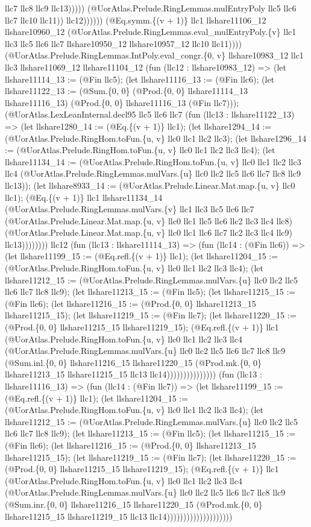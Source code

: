 \documentclass[11pt]{article}
\begin{document}
llc7 llc8 llc9 llc13))))) (@UorAtlas.Prelude.RingLemmas.mulEntryPoly llc5 llc6 llc7 llc10 llc11)) llc12)))))) (@Eq.symm.\{(v + 1)\} llc1 llshare11106\_12 llshare10960\_12 (@UorAtlas.Prelude.RingLemmas.eval\_mulEntryPoly.\{v\} llc1 llc3 llc5 llc6 llc7 llshare10950\_12 llshare10957\_12 llc10 llc11)))) (@UorAtlas.Prelude.RingLemmas.IntPoly.eval\_congr.\{0, v\} llshare10983\_12 llc1 llc3 llshare11069\_12 llshare11104\_12 (fun (llc12 : llshare10983\_12) => (let llshare11114\_13 := (@Fin llc5); (let llshare11116\_13 := (@Fin llc6); (let llshare11122\_13 := (@Sum.\{0, 0\} (@Prod.\{0, 0\} llshare11114\_13 llshare11116\_13) (@Prod.\{0, 0\} llshare11116\_13 (@Fin llc7))); (@UorAtlas.LexLeanInternal.decl95 llc5 llc6 llc7 (fun (llc13 : llshare11122\_13) => (let llshare1280\_14 := (@Eq.\{(v + 1)\} llc1); (let llshare1294\_14 := (@UorAtlas.Prelude.RingHom.toFun.\{u, v\} llc0 llc1 llc2 llc3); (let llshare1296\_14 := (@UorAtlas.Prelude.RingHom.toFun.\{u, v\} llc0 llc1 llc2 llc3 llc4); (let llshare11134\_14 := (@UorAtlas.Prelude.RingHom.toFun.\{u, v\} llc0 llc1 llc2 llc3 llc4 (@UorAtlas.Prelude.RingLemmas.mulVars.\{u\} llc0 llc2 llc5 llc6 llc7 llc8 llc9 llc13)); (let llshare8933\_14 := (@UorAtlas.Prelude.Linear.Mat.map.\{u, v\} llc0 llc1); (@Eq.\{(v + 1)\} llc1 llshare11134\_14 (@UorAtlas.Prelude.RingLemmas.mulVars.\{v\} llc1 llc3 llc5 llc6 llc7 (@UorAtlas.Prelude.Linear.Mat.map.\{u, v\} llc0 llc1 llc5 llc6 llc2 llc3 llc4 llc8) (@UorAtlas.Prelude.Linear.Mat.map.\{u, v\} llc0 llc1 llc6 llc7 llc2 llc3 llc4 llc9) llc13)))))))) llc12 (fun (llc13 : llshare11114\_13) => (fun (llc14 : (@Fin llc6)) => (let llshare11199\_15 := (@Eq.refl.\{(v + 1)\} llc1); (let llshare11204\_15 := (@UorAtlas.Prelude.RingHom.toFun.\{u, v\} llc0 llc1 llc2 llc3 llc4); (let llshare11212\_15 := (@UorAtlas.Prelude.RingLemmas.mulVars.\{u\} llc0 llc2 llc5 llc6 llc7 llc8 llc9); (let llshare11213\_15 := (@Fin llc5); (let llshare11215\_15 := (@Fin llc6); (let llshare11216\_15 := (@Prod.\{0, 0\} llshare11213\_15 llshare11215\_15); (let llshare11219\_15 := (@Fin llc7); (let llshare11220\_15 := (@Prod.\{0, 0\} llshare11215\_15 llshare11219\_15); (@Eq.refl.\{(v + 1)\} llc1 (@UorAtlas.Prelude.RingHom.toFun.\{u, v\} llc0 llc1 llc2 llc3 llc4 (@UorAtlas.Prelude.RingLemmas.mulVars.\{u\} llc0 llc2 llc5 llc6 llc7 llc8 llc9 (@Sum.inl.\{0, 0\} llshare11216\_15 llshare11220\_15 (@Prod.mk.\{0, 0\} llshare11213\_15 llshare11215\_15 llc13 llc14))))))))))))))) (fun (llc13 : llshare11116\_13) => (fun (llc14 : (@Fin llc7)) => (let llshare11199\_15 := (@Eq.refl.\{(v + 1)\} llc1); (let llshare11204\_15 := (@UorAtlas.Prelude.RingHom.toFun.\{u, v\} llc0 llc1 llc2 llc3 llc4); (let llshare11212\_15 := (@UorAtlas.Prelude.RingLemmas.mulVars.\{u\} llc0 llc2 llc5 llc6 llc7 llc8 llc9); (let llshare11213\_15 := (@Fin llc5); (let llshare11215\_15 := (@Fin llc6); (let llshare11216\_15 := (@Prod.\{0, 0\} llshare11213\_15 llshare11215\_15); (let llshare11219\_15 := (@Fin llc7); (let llshare11220\_15 := (@Prod.\{0, 0\} llshare11215\_15 llshare11219\_15); (@Eq.refl.\{(v + 1)\} llc1 (@UorAtlas.Prelude.RingHom.toFun.\{u, v\} llc0 llc1 llc2 llc3 llc4 (@UorAtlas.Prelude.RingLemmas.mulVars.\{u\} llc0 llc2 llc5 llc6 llc7 llc8 llc9 (@Sum.inr.\{0, 0\} llshare11216\_15 llshare11220\_15 (@Prod.mk.\{0, 0\} llshare11215\_15 llshare11219\_15 llc13 llc14)))))))))))))))))))) 
\end{document}

